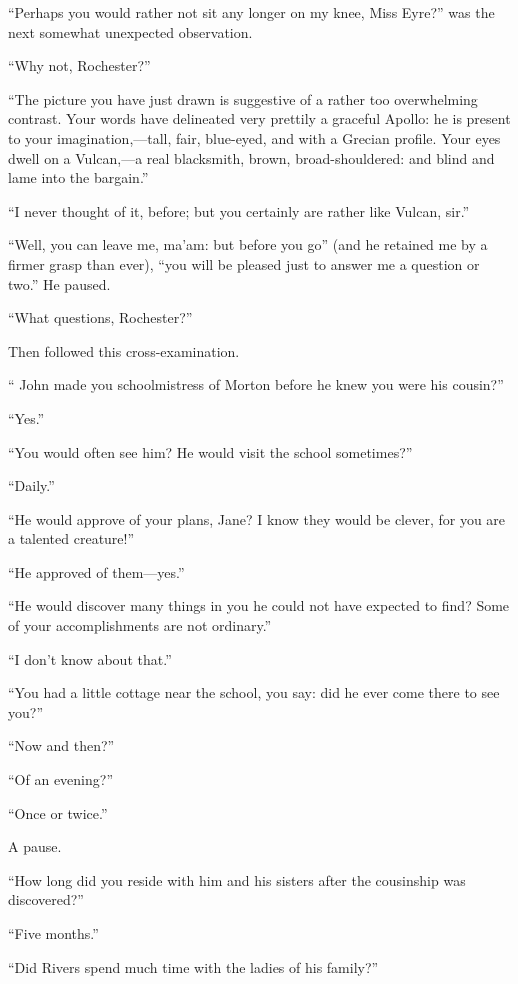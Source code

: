 \enquote{Perhaps you would rather not sit any longer on my knee, Miss
	Eyre?} was the next somewhat unexpected observation.

\enquote{Why not, \Mr{} Rochester?}

\enquote{The picture you have just drawn is suggestive of a rather too
	overwhelming contrast. Your words have delineated very prettily a
	graceful Apollo: he is present to your imagination,---tall, fair,
	blue-eyed, and with a Grecian profile. Your eyes dwell on a Vulcan,---a
	real blacksmith, brown, broad-shouldered: and blind and lame into the
	bargain.}

\enquote{I never thought of it, before; but you certainly are rather
	like Vulcan, sir.}

\enquote{Well, you can leave me, ma'am: but before you go} (and he
retained me by a firmer grasp than ever), \enquote{you will be pleased
	just to answer me a question or two.} He paused.

\enquote{What questions, \Mr{} Rochester?}

Then followed this cross-examination.

\enquote{\St{} John made you schoolmistress of Morton before he knew you
	were his cousin?}

\enquote{Yes.}

\enquote{You would often see him? He would visit the school sometimes?}

\enquote{Daily.}

\enquote{He would approve of your plans, Jane? I know they would be
	clever, for you are a talented creature!}

\enquote{He approved of them---yes.}

\enquote{He would discover many things in you he could not have expected
	to find? Some of your accomplishments are not ordinary.}

\enquote{I don't know about that.}

\enquote{You had a little cottage near the school, you say: did he ever
	come there to see you?}

\enquote{Now and then?}

\enquote{Of an evening?}

\enquote{Once or twice.}

A pause.

\enquote{How long did you reside with him and his sisters after the
	cousinship was discovered?}

\enquote{Five months.}

\enquote{Did Rivers spend much time with the ladies of his family?}

